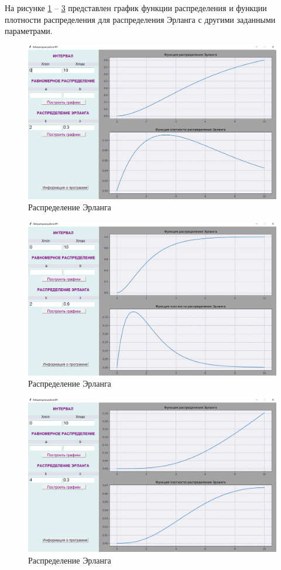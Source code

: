 На рисунке \ref{img:erlangDistr} -- \ref{img:erlangDistr2} представлен график функции распределения и функции плотности распределения для распределения Эрланга с другими заданными параметрами.

\begin{figure}[h]
    \centering
    \includegraphics[scale=0.44]{img/erlangDistr.png}
    \caption{Распределение Эрланга}
    \label{img:erlangDistr}
\end{figure}

\begin{figure}[h]
    \centering
    \includegraphics[scale=0.44]{img/erlangDistr1.png}
    \caption{Распределение Эрланга}
    \label{img:erlangDistr1}
\end{figure}

\begin{figure}[h]
    \centering
    \includegraphics[scale=0.44]{img/erlangDistr2.png}
    \caption{Распределение Эрланга}
    \label{img:erlangDistr2}
\end{figure}
